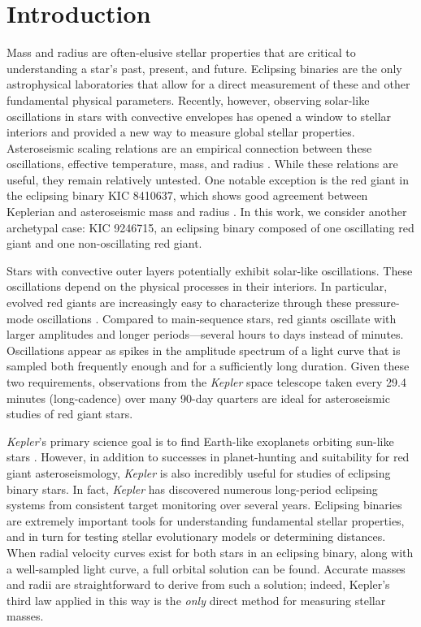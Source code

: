 \section{Introduction}\label{intro}

Mass and radius are often-elusive stellar properties that are critical to understanding a star's past, present, and future. Eclipsing binaries are the only astrophysical laboratories that allow for a direct measurement of these and other fundamental physical parameters. Recently, however, observing solar-like oscillations in stars with convective envelopes has opened a window to stellar interiors and provided a new way to measure global stellar properties. Asteroseismic scaling relations are an empirical connection between these oscillations, effective temperature, mass, and radius \citep{kje95,hub10,mos13}. While these relations are useful, they remain relatively untested. One notable exception is the red giant in the eclipsing binary KIC 8410637, which shows good agreement between Keplerian and asteroseismic mass and radius \citep{fra13}. In this work, we consider another archetypal case: KIC 9246715, an eclipsing binary composed of one oscillating red giant and one non-oscillating red giant.

Stars with convective outer layers potentially exhibit solar-like oscillations. These oscillations depend on the physical processes in their interiors. In particular, evolved red giants are increasingly easy to characterize through these pressure-mode oscillations \citep[for a review of this topic, see][]{cha13}. Compared to main-sequence stars, red giants oscillate with larger amplitudes and longer periods---several hours to days instead of minutes. Oscillations appear as spikes in the amplitude spectrum of a light curve that is sampled both frequently enough and for a sufficiently long duration. Given these two requirements, observations from the \emph{Kepler} space telescope taken every 29.4 minutes (long-cadence) over many 90-day quarters are ideal for asteroseismic studies of red giant stars.

\emph{Kepler}'s primary science goal is to find Earth-like exoplanets orbiting sun-like stars \citep{bor10}. However, in addition to successes in planet-hunting and suitability for red giant asteroseismology, \emph{Kepler} is also incredibly useful for studies of eclipsing binary stars. In fact, \emph{Kepler} has discovered numerous long-period eclipsing systems from consistent target monitoring over several years. Eclipsing binaries are extremely important tools for understanding fundamental stellar properties, and in turn for testing stellar evolutionary models or determining distances. When radial velocity curves exist for both stars in an eclipsing binary, along with a well-sampled light curve, a full orbital solution can be found. Accurate masses and radii are straightforward to derive from such a solution; indeed, Kepler's third law applied in this way is the \emph{only} direct method for measuring stellar masses.

